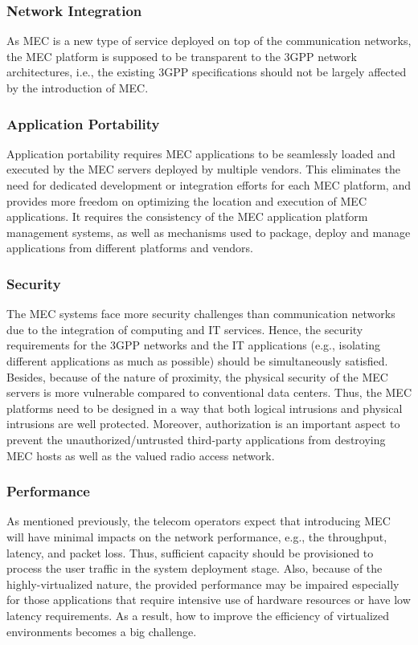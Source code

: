 \documentclass[journal]{IEEEtran}
\begin{document}
{\subsubsection{\textbf{Network Integration}} As MEC is a new type of service deployed on top of the communication networks, the MEC platform is supposed to be transparent to the 3GPP network architectures, i.e., the existing 3GPP specifications should not be largely affected by the introduction of MEC.

\subsubsection{\textbf{Application Portability}} Application portability requires MEC applications to be seamlessly loaded and executed by the MEC servers deployed by multiple vendors. This eliminates the need for dedicated development or integration efforts for each MEC platform, and provides more freedom on optimizing the location and execution of MEC applications. It requires the consistency of the MEC application platform management systems, as well as mechanisms used to package, deploy and manage applications from different platforms and vendors.

\subsubsection{\textbf{Security}} The MEC systems face more security challenges than communication networks due to the integration of computing and IT services. Hence, the security requirements for the 3GPP networks and the IT applications (e.g., isolating different applications as much as possible) should be simultaneously satisfied. Besides, because of the nature of proximity, the physical security of the MEC servers is more vulnerable compared to conventional data centers. Thus, the MEC platforms need to be designed in a way that both logical intrusions and physical intrusions are well protected. Moreover, authorization is an important aspect to prevent the unauthorized/untrusted third-party applications from destroying MEC hosts as well as the valued radio access network.

\subsubsection{\textbf{Performance}} As mentioned previously, the telecom operators expect that introducing MEC will have minimal impacts on the network performance, e.g., the throughput, latency, and packet loss. Thus, sufficient capacity should be provisioned to process the user traffic in the system deployment stage. Also, because of the highly-virtualized nature, the provided performance may be impaired especially for those applications that require intensive use of hardware resources or have low latency requirements. As a result, how to improve the efficiency of virtualized environments becomes a big challenge.

}
\end{document}
